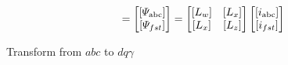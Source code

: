 \documentclass[a4paper,numbers=noenddot,12pt]{scrbook}
\begin{document}
    \begin{equation}
        [\varPsi_{\textup{abc}fst}] = 
        \begin{bmatrix}
            [\varPsi_{\textup{abc}}] \\
            [\varPsi_{fst}]
        \end{bmatrix}
        =
        \begin{bmatrix}
            [L_w] & [L_x] \\
            [L_x] & [L_z]
        \end{bmatrix}
        \begin{bmatrix}
            [i_{\textup{abc}}] \\
            [i_{fst}]
        \end{bmatrix}
        \label{eq:Eq8.23}
    \end{equation}

    Transform from $abc$ to $dq\gamma$
    
\end{document}
